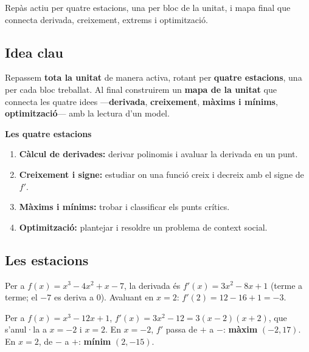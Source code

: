 %
{Repàs actiu per quatre estacions, una per bloc de la unitat, i mapa final que connecta derivada, creixement, extrems i optimització.}

\subsection{Idea clau}

Repassem \textbf{tota la unitat} de manera activa, rotant per \textbf{quatre
estacions}, una per cada bloc treballat. Al final construirem un \textbf{mapa de la
unitat} que connecta les quatre idees —\textbf{derivada}, \textbf{creixement},
\textbf{màxims i mínims}, \textbf{optimització}— amb la lectura d'un model.

\begin{idea}
\textbf{Les quatre estacions}
\begin{enumerate}[leftmargin=1.6em, itemsep=2pt]
  \item \textbf{Càlcul de derivades:} derivar polinomis i avaluar la derivada en un punt.
  \item \textbf{Creixement i signe:} estudiar on una funció creix i decreix amb el signe
        de $f'$.
  \item \textbf{Màxims i mínims:} trobar i classificar els punts crítics.
  \item \textbf{Optimització:} plantejar i resoldre un problema de context social.
\end{enumerate}
\end{idea}

\subsection{Les estacions}

\begin{exemple}
Per a $f(x)=x^3-4x^2+x-7$, la derivada és $f'(x)=3x^2-8x+1$ (terme a terme; el $-7$ es
deriva a $0$). Avaluant en $x=2$: $f'(2)=12-16+1=-3$.
\end{exemple}

\begin{exemple}
Per a $f(x)=x^3-12x+1$, $f'(x)=3x^2-12=3(x-2)(x+2)$, que s'anul·la a $x=-2$ i $x=2$. En
$x=-2$, $f'$ passa de $+$ a $-$: \textbf{màxim} $(-2,17)$. En $x=2$, de $-$ a $+$:
\textbf{mínim} $(2,-15)$.
\end{exemple}

